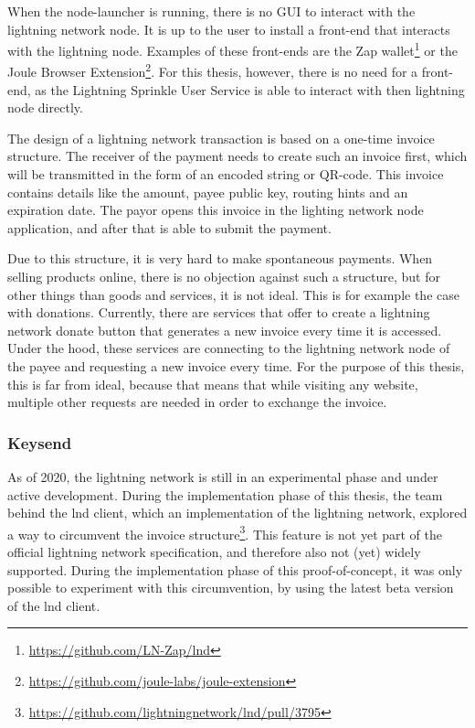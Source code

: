 When the node-launcher is running, there is no GUI to interact with the lightning network node. It is up to the user to install a front-end that interacts with the lightning node. Examples of these front-ends are the Zap wallet\footnote{\url{https://github.com/LN-Zap/lnd}} or the Joule Browser Extension\footnote{\url{https://github.com/joule-labs/joule-extension}}. For this thesis, however, there is no need for a front-end, as the Lightning Sprinkle User Service is able to interact with then lightning node directly. 

The design of a lightning network transaction is based on a one-time invoice structure. The receiver of the payment needs to create such an invoice first, which will be transmitted in the form of an encoded string or QR-code. This invoice contains details like the amount, payee public key, routing hints and an expiration date. The payor opens this invoice in the lighting network node application, and after that is able to submit the payment.

Due to this structure, it is very hard to make spontaneous payments. When selling products online, there is no objection against such a structure, but for other things than goods and services, it is not ideal. This is for example the case with donations. Currently, there are services that offer to create a lightning network donate button that generates a new invoice every time it is accessed. Under the hood, these services are connecting to the lightning network node of the payee and requesting a new invoice every time. For the purpose of this thesis, this is far from ideal, because that means that while visiting any website, multiple other requests are needed in order to exchange the invoice. 

\subsubsection{Keysend}
\label{sec:keysend}

As of 2020, the lightning network is still in an experimental phase and under active development. During the implementation phase of this thesis, the team behind the lnd client, which an implementation of the lightning network, explored a way to circumvent the invoice structure\footnote{\url{https://github.com/lightningnetwork/lnd/pull/3795}}. This feature is not yet part of the official lightning network specification, and therefore also not (yet) widely supported. During the implementation phase of this proof-of-concept, it was only possible to experiment with this circumvention, by using the latest beta version of the lnd client. 

